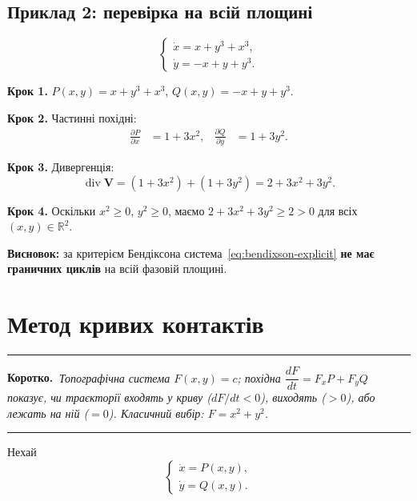 \documentclass[12pt,a4paper]{article}
\newenvironment{korotko}
  {\par\medskip\noindent\begingroup\color{accent!75!black}\rule{\linewidth}{0.4pt}\par
   \noindent\textbf{Коротко.}\itshape\,}
  {\par\noindent\rule{\linewidth}{0.4pt}\endgroup\medskip}
\begin{document}
\subsection{Приклад 2: перевірка на всій площині}

\begin{equation}\label{eq:bendixson-explicit}
\begin{cases}
  \dot{x} = x + y^3 + x^3,\\
  \dot{y} = -x + y + y^3.
\end{cases}
\end{equation}

\textbf{Крок 1.} $P(x,y)=x+y^3+x^3$, \quad $Q(x,y)=-x+y+y^3$.

\textbf{Крок 2.} Частинні похідні:
\begin{align*}
  \frac{\partial P}{\partial x} &= 1 + 3x^2, &
  \frac{\partial Q}{\partial y} &= 1 + 3y^2.
\end{align*}

\textbf{Крок 3.} Дивергенція:
\begin{equation*}
  \operatorname{div}\mathbf{V}
  = (1+3x^2) + (1+3y^2) = 2 + 3x^2 + 3y^2.
\end{equation*}

\textbf{Крок 4.} Оскільки $x^2\ge0$, $y^2\ge0$, маємо
$2+3x^2+3y^2\ge 2>0$ для всіх $(x,y)\in\mathbb{R}^2$.

\textbf{Висновок:} за критерієм Бендіксона система~\eqref{eq:bendixson-explicit}
\textbf{не має граничних циклів} на всій фазовій площині.

\section{Метод кривих контактів}

\begin{korotko}
Топографічна система $F(x,y)=c$; похідна $\dfrac{dF}{dt}=F_x P+F_y Q$ показує,
чи траєкторії входять у криву ($dF/dt<0$), виходять ($>0$), або лежать на ній
($=0$). Класичний вибір: $F=x^2+y^2$.
\end{korotko}

Нехай
\begin{equation}\label{eq:contact-system}
\begin{cases}
  \dot{x} = P(x,y),\\
  \dot{y} = Q(x,y).
\end{cases}
\end{equation}
\end{document}

